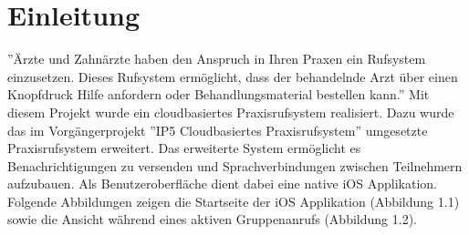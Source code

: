 \section{Einleitung}

''Ärzte und Zahnärzte haben den Anspruch in Ihren Praxen ein Rufsystem einzusetzen.
Dieses Rufsystem ermöglicht, dass der behandelnde Arzt über einen Knopfdruck Hilfe anfordern oder Behandlungsmaterial bestellen kann.''\cite{aufgabenstellung}
Mit diesem Projekt wurde ein cloudbasiertes Praxisrufsystem realisiert.
Dazu wurde das im Vorgängerprojekt ''IP5 Cloudbasiertes Praxisrufsystem'' umgesetzte Praxisrufsystem erweitert.
Das erweiterte System ermöglicht es Benachrichtigungen zu versenden und Sprachverbindungen zwischen Teilnehmern aufzubauen.
Als Benutzeroberfläche dient dabei eine native iOS Applikation.
Folgende Abbildungen zeigen die Startseite der iOS Applikation (Abbildung 1.1) sowie die Ansicht während eines aktiven Gruppenanrufs (Abbildung 1.2).

